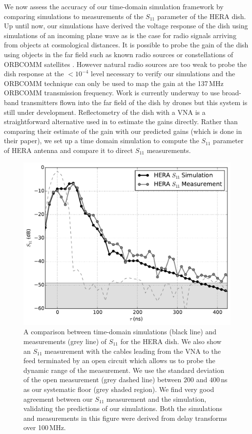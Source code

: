 \documentclass[twocolumn]{emulateapj}
\begin{document}
We now assess the accuracy of our time-domain simulation framework by comparing simulations to measurements of the $S_{11}$ parameter of the HERA dish. Up until now, our simulations have derived the voltage response of the dish using simulations of an incoming plane wave as is the case for radio signals arriving from objects at cosmological distances. It is possible to probe the gain of the dish using objects in the far field such as known radio sources \citep{Thyagarajan:2011,Pober:2012,Colgate:2015} or constellations of ORBCOMM satellites \citep{Neben:2015,Neben:2016}. However natural radio sources are too weak to probe the dish response at the $<10^{-4}$ level necessary to verify our simulations and the ORBCOMM technique can only be used to map the gain at the 137\,MHz ORBCOMM transmission frequency. Work is currently underway to use broad-band transmitters flown into the far field of the dish by drones \citep{Jacobs:2016} but this system is still under development. Reflectometry of the dish with a VNA is a straightforward alternative used in \citet{Patra:2016} to estimate the gains directly. Rather than comparing their estimate of the gain with our predicted gains (which is done in their paper), we set up a time domain simulation to compute the $S_{11}$ parameter of HERA antenna and compare it to direct $S_{11}$ measurements.
\begin{figure}
\includegraphics[width=.5\textwidth]{figures/s11_compare.pdf}
\caption{A comparison between time-domain simulations (black line) and measurements (grey line) of $S_{11}$ for the HERA dish. We also show an $S_{11}$ measurement with the cables leading from the VNA to the feed terminated by an open circuit which allows us to probe the dynamic range of the measurement. We use the standard deviation of the open measurement (grey dashed line) between $200$ and $400$\,ns as our systematic floor (grey shaded region). We find very good agreement between our $S_{11}$ measurement and the simulation, validating the predictions of our simulations. Both the simulations and measurements in this figure were derived from delay transforms over 100\,MHz.}
\label{fig:S11}
\end{figure}
 
\end{document}
